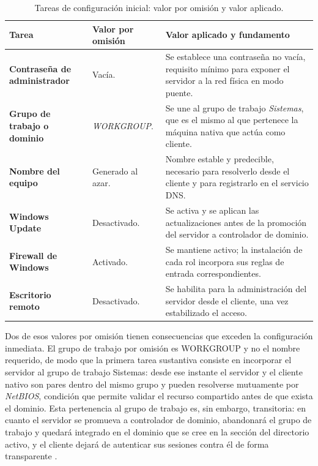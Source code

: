 \documentclass[12pt]{article}
\begin{document}
\begin{table}[htbp]
\centering
\small
\renewcommand{\arraystretch}{1.15}
\renewcommand{\tabularxcolumn}[1]{m{#1}}
\setlength{\emergencystretch}{1.5em}
\caption{Tareas de configuración inicial: valor por omisión y valor aplicado.}
\label{tab:tareasIniciales}
\begin{tabularx}{\textwidth}{>{\centering\arraybackslash}m{3.4cm} m{3.0cm} X}
\toprule
\textbf{Tarea} & \textbf{Valor por omisión} & \textbf{Valor aplicado y fundamento} \\
\midrule
\textbf{Contraseña de administrador} & Vacía. & Se establece una contraseña no vacía, requisito mínimo para exponer el servidor a la red física en modo puente. \\
\addlinespace
\textbf{Grupo de trabajo o dominio} & \textit{WORKGROUP}. & Se une al grupo de trabajo \textit{Sistemas}, que es el mismo al que pertenece la máquina nativa que actúa como cliente. \\
\addlinespace
\textbf{Nombre del equipo} & Generado al azar. & Nombre estable y predecible, necesario para resolverlo desde el cliente y para registrarlo en el servicio DNS. \\
\addlinespace
\textbf{Windows Update} & Desactivado. & Se activa y se aplican las actualizaciones antes de la promoción del servidor a controlador de dominio. \\
\addlinespace
\textbf{Firewall de Windows} & Activado. & Se mantiene activo; la instalación de cada rol incorpora sus reglas de entrada correspondientes. \\
\addlinespace
\textbf{Escritorio remoto} & Desactivado. & Se habilita para la administración del servidor desde el cliente, una vez estabilizado el acceso. \\
\bottomrule
\end{tabularx}
\end{table}

Dos de esos valores por omisión tienen consecuencias que exceden la configuración inmediata. El grupo de trabajo por omisión es WORKGROUP y no el nombre requerido, de modo que la primera tarea sustantiva consiste en incorporar el servidor al grupo de trabajo Sistemas: desde ese instante el servidor y el cliente nativo son pares dentro del mismo grupo y pueden resolverse mutuamente por \textit{NetBIOS}, condición que permite validar el recurso compartido antes de que exista el dominio. Esta pertenencia al grupo de trabajo es, sin embargo, transitoria: en cuanto el servidor se promueva a controlador de dominio, abandonará el grupo de trabajo y quedará integrado en el dominio que se cree en la sección del directorio activo, y el cliente dejará de autenticar sus sesiones contra él de forma transparente \parencite{microsoftInstallADDS}.
\end{document}

